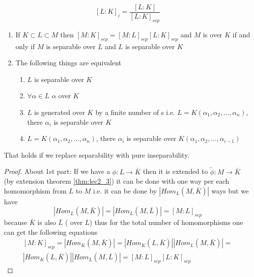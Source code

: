 \begin{definition}
  \[
  \left[L:K\right]_i =
  \frac{\left[L:K\right]}{\left[L:K\right]_{sep}}
  \]
  \label{def:inseparabledegree}
\end{definition}

\begin{theorem}
  \begin{enumerate}
  \item If $K \subset L \subset M$ then
    $\left[M:K\right]_{sep} = \left[M:L\right]_{sep}
    \left[L:K\right]_{sep}$
    and $M$ is  over $K$ if and only
    if $M$ is separable over $L$ and $L$ is separable over $K$
  \item The following things are equivalent
    \begin{enumerate}
    \item $L$ is separable over $K$ \label{thm:lec3_3:itm:1}
    \item $\forall \alpha \in L$ $\alpha$ 
      over $K$ \label{thm:lec3_3:itm:2}
    \item $L$ is generated over $K$ by a finite number of
      s i.e.
      $L = K\left(\alpha_1, \alpha_2, \dots, \alpha_n\right)$, there
      $\alpha_i$ is separable over $K$
      \label{thm:lec3_3:itm:3}
    \item   $L = K\left(\alpha_1, \alpha_2, \dots, \alpha_n\right)$, there
      $\alpha_i$ is separable over
      $K\left(\alpha_1, \alpha_2, \dots, \alpha_{i-1}\right)$
      \label{thm:lec3_3:itm:4}
    \end{enumerate}
  \end{enumerate}
  \begin{remark}
    That holds if we replace separability with pure inseparability.
  \end{remark}
  \label{thm:lec3_3}
  \begin{proof}
    About 1st part:
    If we have a  $\phi: L \to \bar{K}$ then
    it is extended to $\tilde{\phi}: M \to \bar{K}$ (by extension
    theorem \ref{thm:lec2_3}) it can be done with one way per each
    homomorphism from $L$ to $M$ i.e. it can be done by
    $\left|Hom_L\left(M, \bar{K}\right)\right|$ ways but we have
    \[
    \left|Hom_L\left(M, \bar{K}\right)\right| =
    \left|Hom_L\left(M, \bar{L}\right)\right| = \left[M:L\right]_{sep}
    \]
    because $\bar{K}$ is also
    $\bar{L}$ ( over $L$) thus for the
    total number of homomorphisms one can get the following 
    equations 
    \begin{eqnarray}
      \left[M:K\right]_{sep} = 
      \left|Hom_K\left(M, \bar{K}\right)\right| =
      \left|Hom_K\left(L, \bar{K}\right)\right|
      \left|Hom_L\left(M, \bar{K}\right)\right| =
      \nonumber \\
      \left|Hom_K\left(L, \bar{K}\right)\right|
      \left|Hom_L\left(M, \bar{L}\right)\right| =
      \left[M:L\right]_{sep} \left[L:K\right]_{sep}
      \nonumber
    \end{eqnarray}


\end{proof}
\end{theorem}
